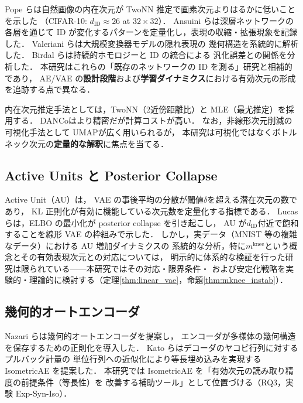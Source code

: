 \documentclass[11pt,a4paper]{jsarticle}
\newcommand{\mknee}{m^{\mathrm{knee}}}
\begin{document}
Pope ら\cite{pope2021intrinsic}は自然画像の内在次元が
TwoNN 推定で画素次元よりはるかに低いことを示した
（CIFAR-10: $d_\mathrm{ID} \approx 26$ at $32 \times 32$）．
Ansuini ら\cite{ansuini2019intrinsic}は深層ネットワークの各層を通じて
ID が変化するパターンを定量化し，表現の収縮・拡張現象を記録した．
Valeriani ら\cite{valeriani2023geometry}は大規模変換器モデルの隠れ表現の
幾何構造を系統的に解析した．
Birdal ら\cite{birdal2021intrinsic}は持続的ホモロジーと ID の統合による
汎化誤差との関係を分析した．
本研究はこれらの「既存のネットワークの ID を測る」研究と相補的であり，
AE/VAE の\textbf{設計段階}および\textbf{学習ダイナミクス}における有効次元の形成を追跡する点で異なる．

内在次元推定手法としては，TwoNN\cite{facco2017twonn}（2近傍距離比）と
MLE\cite{levina2005mle}（最尤推定）を採用する．
DANCo\cite{ceruti2014danco}はより精密だが計算コストが高い．
なお，非線形次元削減の可視化手法として UMAP\cite{mcinnes2018umap}が広く用いられるが，
本研究は可視化ではなくボトルネック次元の\textbf{定量的な解釈}に焦点を当てる．

\subsection{Active Units と Posterior Collapse}\label{sec:related_au}

Active Unit（AU）\cite{lucas2019elbo,higgins2017betavae}は，
VAE の事後平均の分散が閾値$\delta$を超える潜在次元の数であり，
KL 正則化が有効に機能している次元数を定量化する指標である．
Lucas ら\cite{lucas2019elbo}は，ELBO の最小化が posterior collapse を引き起こし，
AU が$d_{\mathrm{ID}}$付近で飽和することを線形 VAE の枠組みで示した．
しかし，実データ（MNIST 等の複雑なデータ）における AU 増加ダイナミクスの
系統的な分析，特に$\mknee$という概念とその有効表現次元との対応については，
明示的に体系的な検証を行った研究は限られている——本研究ではその対応・限界条件・
および安定化戦略を実験的・理論的に検討する（定理\ref{thm:linear_vae}，命題\ref{thm:mknee_instab}）．

\subsection{幾何的オートエンコーダ}\label{sec:related_geo}

Nazari ら\cite{nazari2023geometric}は幾何的オートエンコーダを提案し，
エンコーダが多様体の幾何構造を保存するための正則化を導入した．
Kato ら\cite{kato2020rdae}はデコーダのヤコビ行列に対するプルバック計量の
単位行列への近似化により等長埋め込みを実現する IsometricAE を提案した．
本研究では IsometricAE を「有効次元の読み取り精度の前提条件（等長性）を
改善する補助ツール」として位置づける（RQ3，実験 Exp-Syn-Iso）．
\end{document}
